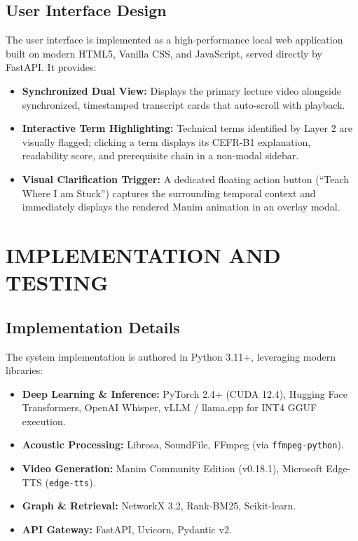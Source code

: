 \documentclass[a4paper,12pt]{report}
\begin{document}
\section{User Interface Design}
The user interface is implemented as a high-performance local web application built on modern HTML5, Vanilla CSS, and JavaScript, served directly by FastAPI. It provides:
\begin{itemize}
    \item \textbf{Synchronized Dual View:} Displays the primary lecture video alongside synchronized, timestamped transcript cards that auto-scroll with playback.
    \item \textbf{Interactive Term Highlighting:} Technical terms identified by Layer 2 are visually flagged; clicking a term displays its CEFR-B1 explanation, readability score, and prerequisite chain in a non-modal sidebar.
    \item \textbf{Visual Clarification Trigger:} A dedicated floating action button (``Teach Where I am Stuck'') captures the surrounding temporal context and immediately displays the rendered Manim animation in an overlay modal.
\end{itemize}


\chapter{IMPLEMENTATION AND TESTING}

\section{Implementation Details}
The system implementation is authored in Python 3.11+, leveraging modern libraries:
\begin{itemize}
    \item \textbf{Deep Learning \& Inference:} PyTorch 2.4+ (CUDA 12.4), Hugging Face Transformers, OpenAI Whisper, vLLM / llama.cpp for INT4 GGUF execution.
    \item \textbf{Acoustic Processing:} Librosa, SoundFile, FFmpeg (via \texttt{ffmpeg-python}).
    \item \textbf{Video Generation:} Manim Community Edition (v0.18.1), Microsoft Edge-TTS (\texttt{edge-tts}).
    \item \textbf{Graph \& Retrieval:} NetworkX 3.2, Rank-BM25, Scikit-learn.
    \item \textbf{API Gateway:} FastAPI, Uvicorn, Pydantic v2.
\end{itemize}
\end{document}

